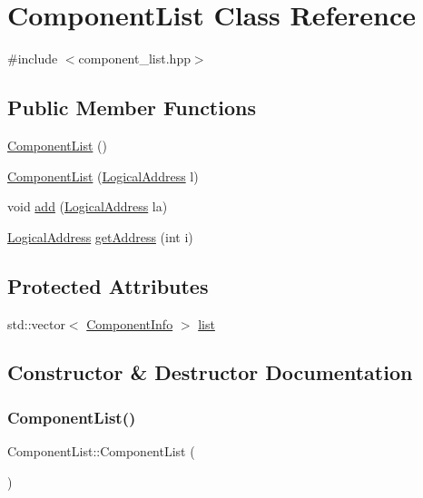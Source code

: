 \hypertarget{classComponentList}{}\section{Component\+List Class Reference}
\label{classComponentList}


{\ttfamily \#include $<$component\+\_\+list.\+hpp$>$}

\subsection*{Public Member Functions}
\begin{DoxyCompactItemize}
\item 
\hyperlink{classComponentList_a15ab6b476094b0ee17090086e6cec168}{Component\+List} ()
\item 
\hyperlink{classComponentList_ab260978fcc65754d836c6a3cb8b42341}{Component\+List} (\hyperlink{structLogicalAddress}{Logical\+Address} l)
\item 
void \hyperlink{classComponentList_a16746faf0795286b07d34315506a0940}{add} (\hyperlink{structLogicalAddress}{Logical\+Address} la)
\item 
\hyperlink{structLogicalAddress}{Logical\+Address} \hyperlink{classComponentList_a19d60f3644b19fa267ea669e2e47d409}{get\+Address} (int i)
\end{DoxyCompactItemize}
\subsection*{Protected Attributes}
\begin{DoxyCompactItemize}
\item 
std\+::vector$<$ \hyperlink{structComponentInfo}{Component\+Info} $>$ \hyperlink{classComponentList_abab41b240f17f716229e5abd5279dd9b}{list}
\end{DoxyCompactItemize}


\subsection{Constructor \& Destructor Documentation}
\mbox{\label{classComponentList_a15ab6b476094b0ee17090086e6cec168}} 
\subsubsection{\texorpdfstring{Component\+List()}{ComponentList()}\hspace{0.1cm}{\footnotesize\ttfamily [1/2]}}
{\footnotesize\ttfamily Component\+List\+::\+Component\+List (\begin{DoxyParamCaption}{ }\end{DoxyParamCaption})\hspace{0.3cm}{\ttfamily [inline]}}

